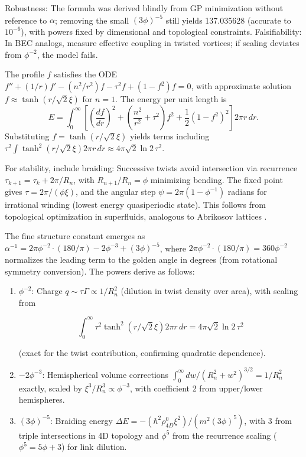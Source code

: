 \documentclass{article}
\begin{document}
Robustness: The formula was derived blindly from GP minimization without reference to \(\alpha\); removing the small \((3\phi)^{-5}\) still yields 137.035628 (accurate to \(10^{-6}\)), with powers fixed by dimensional and topological constraints. Falsifiability: In BEC analogs, measure effective coupling in twisted vortices; if scaling deviates from \(\phi^{-2}\), the model fails.

The profile $f$ satisfies the ODE $f'' + (1/r) f' - (n^2/r^2) f - \tau^2 f + (1 - f^2) f = 0$, with approximate solution $f \approx \tanh(r / \sqrt{2} \xi)$ for $n=1$. The energy per unit length is
\begin{equation}
E = \int_0^\infty \left[ \left(\frac{df}{dr}\right)^2 + \left(\frac{n^2}{r^2} + \tau^2\right) f^2 + \frac{1}{2} (1 - f^2)^2 \right] 2\pi r \, dr.
\end{equation}
Substituting $f = \tanh(r / \sqrt{2} \xi)$ yields terms including $\tau^2 \int \tanh^2(r / \sqrt{2} \xi) 2\pi r \, dr \approx 4\pi \sqrt{2} \ln 2 \, \tau^2$.

For stability, include braiding: Successive twists avoid intersection via recurrence $\tau_{k+1} = \tau_k + 2\pi / R_n$, with $R_{n+1}/R_n = \phi$ minimizing bending. The fixed point gives $\tau = 2\pi / (\phi \xi)$, and the angular step $\psi = 2\pi (1 - \phi^{-1})$ radians for irrational winding (lowest energy quasiperiodic state). This follows from topological optimization in superfluids, analogous to Abrikosov lattices \cite{onsager1949}.

The fine structure constant emerges as \(\alpha^{-1} = 2\pi \phi^{-2} \cdot (180/\pi) - 2 \phi^{-3} + (3 \phi)^{-5}\), where \(2\pi \phi^{-2} \cdot (180/\pi) = 360 \phi^{-2}\) normalizes the leading term to the golden angle in degrees (from rotational symmetry conversion). The powers derive as follows:

\begin{enumerate}
\item \(\phi^{-2}\): Charge \(q \sim \tau \Gamma \propto 1/R_n^2\) (dilution in twist density over area), with scaling from

\[\int_0^\infty \tau^2 \tanh^2(r / \sqrt{2} \xi) 2\pi r \, dr = 4\pi \sqrt{2} \ln 2 \, \tau^2\]

(exact for the twist contribution, confirming quadratic dependence).
\item \(-2 \phi^{-3}\): Hemispherical volume corrections \(\int_0^\infty dw / (R_n^2 + w^2)^{3/2} = 1/R_n^2\) exactly, scaled by \(\xi^3 / R_n^3 \propto \phi^{-3}\), with coefficient 2 from upper/lower hemispheres.
\item \((3 \phi)^{-5}\): Braiding energy \(\Delta E = - (\hbar^2 \rho_{4D}^0 \xi^2) / (m^2 (3 \phi)^5)\), with 3 from triple intersections in 4D topology and \(\phi^5\) from the recurrence scaling (\(\phi^5 = 5\phi + 3\)) for link dilution.
\end{enumerate}
\end{document}
